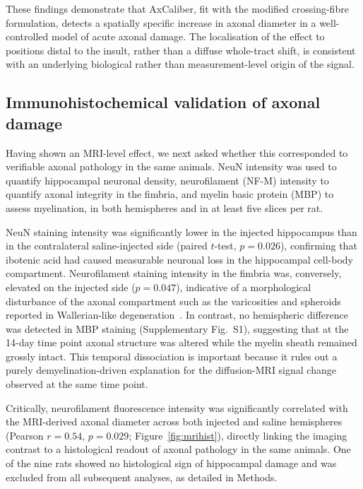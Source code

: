 \documentclass[11pt]{article}
\begin{document}
These findings demonstrate that AxCaliber, fit with the modified crossing-fibre formulation, detects a spatially specific increase in axonal diameter in a well-controlled model of acute axonal damage. The localisation of the effect to positions distal to the insult, rather than a diffuse whole-tract shift, is consistent with an underlying biological rather than measurement-level origin of the signal.

\subsection{Immunohistochemical validation of axonal damage}

Having shown an MRI-level effect, we next asked whether this corresponded to verifiable axonal pathology in the same animals. NeuN intensity was used to quantify hippocampal neuronal density, neurofilament (NF-M) intensity to quantify axonal integrity in the fimbria, and myelin basic protein (MBP) to assess myelination, in both hemispheres and in at least five slices per rat.

NeuN staining intensity was significantly lower in the injected hippocampus than in the contralateral saline-injected side (paired $t$-test, $p=0.026$), confirming that ibotenic acid had caused measurable neuronal loss in the hippocampal cell-body compartment. Neurofilament staining intensity in the fimbria was, conversely, elevated on the injected side ($p=0.047$), indicative of a morphological disturbance of the axonal compartment such as the varicosities and spheroids reported in Wallerian-like degeneration~\cite{criste2014axonal,tallantyre2010demyelinated}. In contrast, no hemispheric difference was detected in MBP staining (Supplementary Fig.~S1), suggesting that at the 14-day time point axonal structure was altered while the myelin sheath remained grossly intact. This temporal dissociation is important because it rules out a purely demyelination-driven explanation for the diffusion-MRI signal change observed at the same time point.

Critically, neurofilament fluorescence intensity was significantly correlated with the MRI-derived axonal diameter across both injected and saline hemispheres (Pearson $r=0.54$, $p=0.029$; Figure~\ref{fig:mrihist}), directly linking the imaging contrast to a histological readout of axonal pathology in the same animals. One of the nine rats showed no histological sign of hippocampal damage and was excluded from all subsequent analyses, as detailed in Methods.
\end{document}
